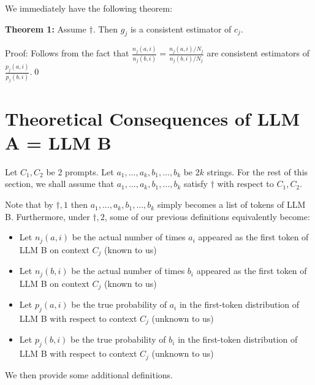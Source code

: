 \documentclass{article}
\begin{document}
We immediately have the following theorem:



\textbf{Theorem 1:} Assume $\displaystyle \dagger $. Then $\displaystyle g_{j}$ is a consistent estimator of $\displaystyle c_{j}$.



Proof: Follows from the fact that $\displaystyle \frac{n_{j}( a,i)}{n_{j}( b,i)} =\frac{n_{j}( a,i) /N_{j}}{n_{j}( b,i) /N_{j}}$ are consistent estimators of $\displaystyle \frac{p_{j}( a,i)}{p_{j}( b,i)}$.\qed 





\section{Theoretical Consequences of LLM A = LLM B}
\begin{mdframed}
Let $C_1, C_2$ be 2 prompts. Let $a_1,\ldots,a_k,b_1,\ldots,b_k$ be $2k$ strings.
For the rest of this section, we shall assume that
$a_1,\ldots,a_k,b_1,\ldots,b_k$ satisfy $\dagger$ with respect to $C_1, C_2$.
\end{mdframed}


Note that by $\displaystyle \dagger ,1$ then $\displaystyle a_{1} ,...,a_{k} ,b_{1} ,...,b_{k}$ simply becomes a list of tokens of LLM B. Furthermore, under $\displaystyle \dagger ,2$, some of our previous definitions equivalently become:
\begin{itemize}
\item Let $\displaystyle n_{j}( a,i)$ be the actual number of times $\displaystyle a_{i}$ appeared as the first token of LLM B on context $\displaystyle C_{j}$ (known to us)
\item Let $\displaystyle n_{j}( b,i)$ be the actual number of times $\displaystyle b_{i}$ appeared as the first token of LLM B on context $\displaystyle C_{j}$ (known to us)
\item Let $\displaystyle p_{j}( a,i)$ be the true probability of $\displaystyle a_{i}$ in the first-token distribution of LLM B with respect to context $\displaystyle C_{j}$ (unknown to us)
\item Let $\displaystyle p_{j}( b,i)$ be the true probability of $\displaystyle b_{i}$ in the first-token distribution of LLM B with respect to context $\displaystyle C_{j}$ (unknown to us)
\end{itemize}



We then provide some additional definitions.
\end{document}
